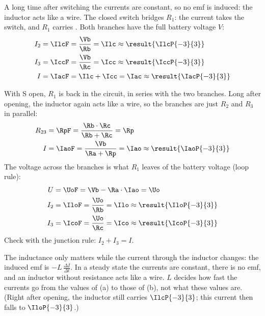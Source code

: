 \begin{abcliste}
\abc A long time after switching the currents are constant, so no emf is induced: the inductor acts like a wire. The closed switch bridges $R_1$: the current takes the switch, and $R_1$ carries . Both branches have the full battery voltage $V$:
\begin{align}
 I_2 &= \IlcF = \frac{\Vb}{\Rb} = \Ilc \approx \result{\IlcP{-3}{3}} \\
 I_3 &= \IccF = \frac{\Vb}{\Rc} = \Icc \approx \result{\IccP{-3}{3}} \\
 I &= \IacF = \Ilc+\Icc = \Iac \approx \result{\IacP{-3}{3}}
\end{align}

\abc With S open, $R_1$ is back in the circuit, in series with the two branches. Long after opening, the inductor again acts like a wire, so the branches are just $R_2$ and $R_3$ in parallel:
\begin{align}
 R_{23} &= \RpF = \frac{\Rb\cdot\Rc}{\Rb+\Rc} = \Rp \\
 I &= \IaoF = \frac{\Vb}{\Ra+\Rp} = \Iao \approx \result{\IaoP{-3}{3}}
\end{align}
The voltage across the branches is what $R_1$ leaves of the battery voltage (loop rule):
\begin{align}
 U &= \UoF = \Vb-\Ra\cdot\Iao = \Uo \\
 I_2 &= \IloF = \frac{\Uo}{\Rb} = \Ilo \approx \result{\IloP{-3}{3}} \\
 I_3 &= \IcoF = \frac{\Uo}{\Rc} = \Ico \approx \result{\IcoP{-3}{3}}
\end{align}
Check with the junction rule: $I_2 + I_3 = I$.

\abc The inductance only matters while the current through the inductor changes: the induced emf is $-L\,\frac{\Delta I}{\Delta t}$. In a steady state the currents are constant, there is no emf, and an inductor without resistance acts like a wire. $L$ decides how fast the currents go from the values of (a) to those of (b), not what these values are. (Right after opening, the inductor still carries $\IlcP{-3}{3}$; this current then falls to $\IloP{-3}{3}$.)
\end{abcliste}
